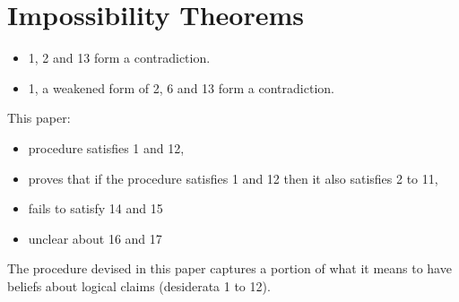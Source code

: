 \documentclass{article}
\begin{document}
\section{Impossibility Theorems}

\begin{itemize}
\item 1, 2 and 13 form a contradiction.
\item 1, a weakened form of 2, 6 and 13 form a contradiction.
\end{itemize}

This paper:

\begin{itemize}
\item procedure satisfies 1 and 12,
\item proves that if the procedure satisfies 1 and 12 then it also satisfies 2 to 11,
\item fails to satisfy 14 and 15
\item unclear about 16 and 17
\end{itemize}

The procedure devised in this paper captures a portion of what it means to have
beliefs about logical claims (desiderata 1 to 12).
\end{document}
